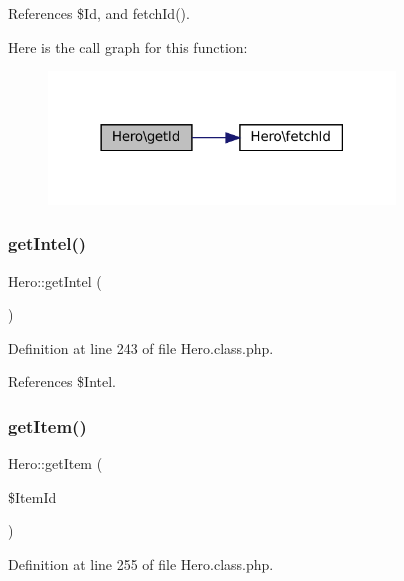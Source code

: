 References \$\+Id, and fetch\+Id().

Here is the call graph for this function\+:\nopagebreak
\begin{figure}[H]
\begin{center}
\leavevmode
\includegraphics[width=261pt]{class_hero_a395e2c32870dc757c39837615368aaa5_cgraph}
\end{center}
\end{figure}
\mbox{\label{class_hero_aded0e048a90f381fbe01ce8a6227c6a3}} 
\subsubsection{\texorpdfstring{get\+Intel()}{getIntel()}}
{\footnotesize\ttfamily Hero\+::get\+Intel (\begin{DoxyParamCaption}{ }\end{DoxyParamCaption})}



Definition at line 243 of file Hero.\+class.\+php.



References \$\+Intel.

\mbox{\label{class_hero_ac307892e8fbd47335279e60ca2725692}} 
\subsubsection{\texorpdfstring{get\+Item()}{getItem()}}
{\footnotesize\ttfamily Hero\+::get\+Item (\begin{DoxyParamCaption}\item[{}]{\$\+Item\+Id }\end{DoxyParamCaption})}



Definition at line 255 of file Hero.\+class.\+php.

\mbox{\label{class_hero_a461a3bd345dfcc026603d83d1e48a0f6}} 
